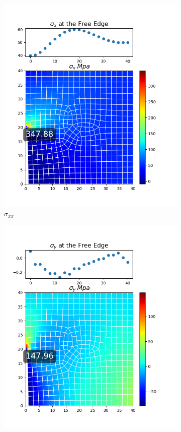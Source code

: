 \documentclass[twoside,twocolumn,10pt]{article}
\begin{document}
\begin{figure}[!ht]
  \begin{subfigure}[c]{0.26\textwidth}
    \includegraphics[width=1.\linewidth]{Q2_5/Q5_0.05_x_quad.png}
    \caption{$\sigma_{xx}$}
    \label{fig:x_quad_0.05}
  \end{subfigure}%
  \begin{subfigure}[c]{0.26\textwidth}
    \includegraphics[width=1.\linewidth]{Q2_5/Q5_0.05_y_quad.png}

\end{subfigure}
\end{figure}
\end{document}
